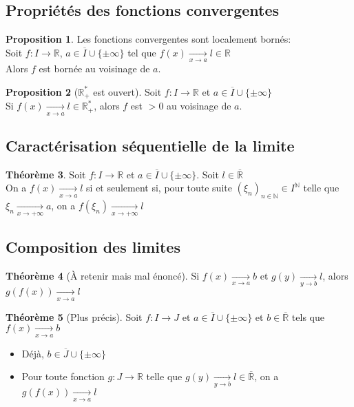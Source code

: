 \documentclass[10pt,a4paper]{article}
\theoremstyle{definition}
\newtheorem{proposition}{Proposition}[section]
\newtheorem{theorem}[proposition]{Théorème}
\begin{document}
\subsection{Propriétés des fonctions convergentes}
\begin{proposition}
Les fonctions convergentes sont localement bornés: \\
Soit $f: I \to \mathbb{R}$, $a \in \overline{I} \cup \{ \pm\infty \}$ tel que $f(x) \xrightarrow[x \to a]{} l \in \mathbb{R}$ \\
Alors $f$ est bornée au voisinage de $a$.
\end{proposition}
\begin{proposition}[$\mathbb{R}_+^*$ est ouvert]
Soit $f: I \to \mathbb{R}$ et $a \in \overline{I} \cup \{ \pm\infty \}$ \\
Si $f(x) \xrightarrow[x \to a]{} l \in \mathbb{R}_+^*$, alors $f$ est $>0$ au voisinage de $a$.
\end{proposition}

\subsection{Caractérisation séquentielle de la limite}
\begin{theorem}
Soit $f: I \to \mathbb{R}$ et $a \in \overline{I} \cup \{ \pm\infty \}$. Soit $l \in \overline{\mathbb{R}}$ \\
On a $f(x) \xrightarrow[x \to a]{} l$ si et seulement si, pour toute suite $(\xi_n)_{n \in \mathbb{N}} \in I^\mathbb{N}$ telle que $\xi_n \xrightarrow[x \to +\infty]{} a$, on a $f(\xi_n) \xrightarrow[x \to +\infty]{} l$
\end{theorem}

\subsection{Composition des limites}
\begin{theorem}[À retenir mais mal énoncé]
Si $f(x) \xrightarrow[x \to a]{} b$ et $g(y) \xrightarrow[y \to b]{} l$, alors $g(f(x)) \xrightarrow[x \to a]{} l$
\end{theorem}
\begin{theorem}[Plus précis]
Soit $f: I \to J$ et $a \in \overline{I} \cup \{ \pm\infty \}$ et $b \in \overline{\mathbb{R}}$ tels que $f(x) \xrightarrow[x \to a]{} b$
\begin{itemize}
\item Déjà, $b \in \overline{J} \cup \{ \pm\infty \}$
\item Pour toute fonction $g: J \to \mathbb{R}$ telle que $g(y) \xrightarrow[y \to b]{} l \in \overline{\mathbb{R}}$, on a $g(f(x)) \xrightarrow[x \to a]{} l$
\end{itemize}
\end{theorem}
\end{document}
